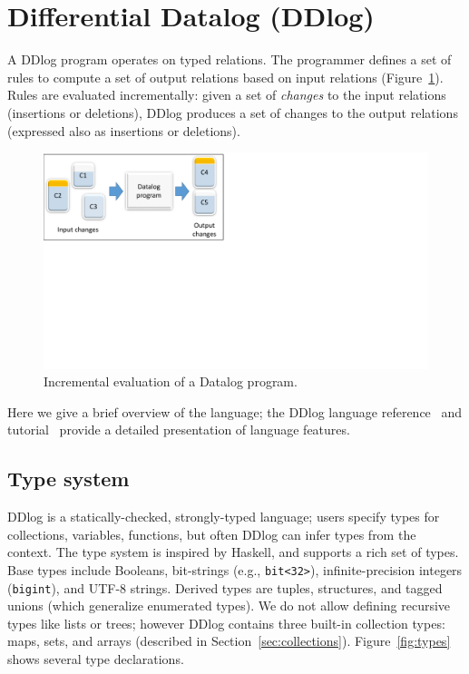 \section{Differential Datalog (DDlog)}\label{sec-ddlog}

A DDlog program operates on typed relations.  The programmer defines a
set of rules to compute a set of output relations based on input
relations (Figure~\ref{fig:differential}).  Rules are evaluated
incrementally: given a set of \emph{changes} to the input relations
(insertions or deletions), DDlog produces a set of changes to the
output relations (expressed also as insertions or deletions).

\begin{figure}[t]
    \center
    \includegraphics[width=0.5\columnwidth,clip=true,trim=0in 4.4in 6.5in 0in]{differential.pdf}
    \caption{Incremental evaluation of a Datalog program.\label{fig:differential}}
\end{figure}

Here we give a brief overview of the language; the DDlog language
reference~\cite{ddlog-manual} and tutorial~\cite{ddlog-tutorial}
provide a detailed presentation of language features.

\subsection{Type system}

DDlog is a statically-checked, strongly-typed language; users specify
types for collections, variables, functions, but often DDlog can infer
types from the context.  The type system is inspired by Haskell, and
supports a rich set of types.  Base types include Booleans,
bit-strings (e.g., \texttt{bit<32>}), infinite-precision integers
(\texttt{bigint}), and UTF-8 strings.  Derived types are tuples,
structures, and tagged unions (which generalize enumerated types).  We
do not allow defining recursive types like lists or trees; however
DDlog contains three built-in collection types: maps, sets, and arrays
(described in Section~\ref{sec:collections}).  Figure~\ref{fig:types}
shows several type declarations.

